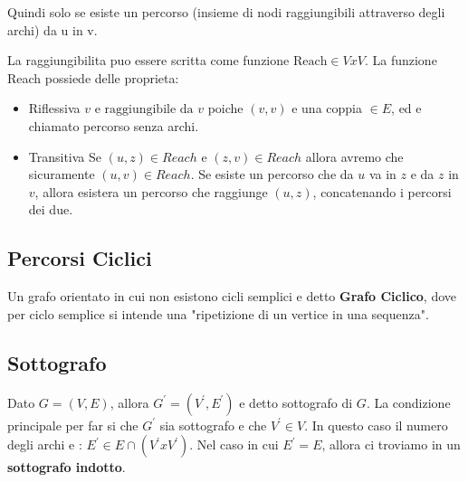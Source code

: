Quindi solo se esiste un percorso (insieme di nodi raggiungibili attraverso degli archi) da u in v.

La raggiungibilita puo essere scritta come funzione $\text{Reach} \in V x V$. La funzione Reach possiede delle proprieta:
\begin{itemize}
	\item Riflessiva
			$v \text{ e raggiungibile da } v$ poiche $(v,v)$ e una coppia $\in E$, ed e chiamato percorso senza archi. 
	\item Transitiva
			Se $(u,z) \in Reach$ e $(z,v) \in Reach$ allora avremo che sicuramente $(u,v) \in Reach$.
			Se esiste un percorso che da $u$ va in $z$ e da $z$ in $v$, allora esistera un percorso che raggiunge $(u,z)$, concatenando i percorsi dei due.
\end{itemize}  

\subsection{Percorsi Ciclici}
Un grafo orientato in cui non esistono cicli semplici e detto \textbf{Grafo Ciclico}, dove per ciclo semplice si intende una "ripetizione di un vertice in una sequenza".


\subsection{Sottografo}
Dato $G = (V,E)$, allora $G^{\prime} = (V^{\prime},E^{\prime})$ e detto sottografo di $G$.
La condizione principale per far si che $G^{\prime}$ sia sottografo e che $V^{\prime} \in V$.
In questo caso il numero degli archi e : $E^{\prime} \in E \cap (V^{\prime} x V^{\prime})$.
Nel caso in cui $E^{\prime} = E$, allora ci troviamo in un \textbf{sottografo indotto}.


